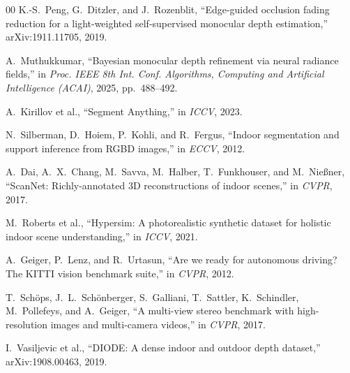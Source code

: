 \documentclass[conference]{IEEEtran}
\begin{document}
\begin{thebibliography}{00}
 K.-S.~Peng, G.~Ditzler, and J.~Rozenblit, ``Edge-guided
occlusion fading reduction for a light-weighted self-supervised monocular depth
estimation,'' arXiv:1911.11705, 2019.

 A.~Muthukkumar, ``Bayesian monocular depth refinement via
neural radiance fields,'' in \emph{Proc. IEEE 8th Int. Conf. Algorithms,
Computing and Artificial Intelligence (ACAI)}, 2025, pp.~488--492.

 A.~Kirillov et al., ``Segment Anything,'' in \emph{ICCV}, 2023.

 N.~Silberman, D.~Hoiem, P.~Kohli, and R.~Fergus, ``Indoor
segmentation and support inference from RGBD images,'' in \emph{ECCV}, 2012.

 A.~Dai, A.~X.~Chang, M.~Savva, M.~Halber, T.~Funkhouser, and
M.~Nie{\ss}ner, ``ScanNet: Richly-annotated 3D reconstructions of indoor
scenes,'' in \emph{CVPR}, 2017.

 M.~Roberts et al., ``Hypersim: A photorealistic synthetic
dataset for holistic indoor scene understanding,'' in \emph{ICCV}, 2021.

 A.~Geiger, P.~Lenz, and R.~Urtasun, ``Are we ready for
autonomous driving? The KITTI vision benchmark suite,'' in \emph{CVPR},
2012.

 T.~Sch\"ops, J.~L.~Sch\"onberger, S.~Galliani, T.~Sattler,
K.~Schindler, M.~Pollefeys, and A.~Geiger, ``A multi-view stereo benchmark
with high-resolution images and multi-camera videos,'' in \emph{CVPR}, 2017.

 I.~Vasiljevic et al., ``DIODE: A dense indoor and outdoor
depth dataset,'' arXiv:1908.00463, 2019.

\end{thebibliography}
\end{document}
